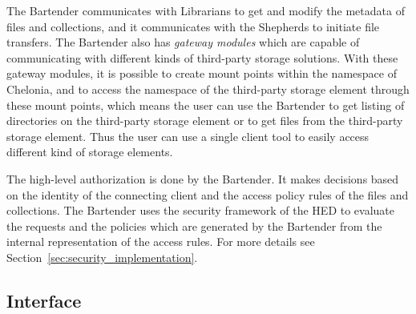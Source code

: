 \documentclass{book}
\begin{document}
The Bartender communicates with Librarians to get and modify the metadata of files and collections, and it communicates with the Shepherds to initiate file transfers. The Bartender also has \emph{gateway modules} which are capable of communicating with different kinds of third-party storage solutions. With these gateway modules, it is possible to create mount points within the namespace of Chelonia, and to access the namespace of the third-party storage element through these mount points, which means the user can use the Bartender to get listing of directories on the third-party storage element or to get files from the third-party storage element. Thus the user can use a single client tool to easily access different kind of storage elements.

The high-level authorization is done by the Bartender. It makes decisions based on the identity of the connecting client and the access policy rules of the files and collections. The Bartender uses the security framework of the HED to evaluate the requests and the policies which are generated by the Bartender from the internal representation of the access rules. For more details see Section~\ref{sec:security_implementation}.


\subsection{Interface} %
\end{document}
